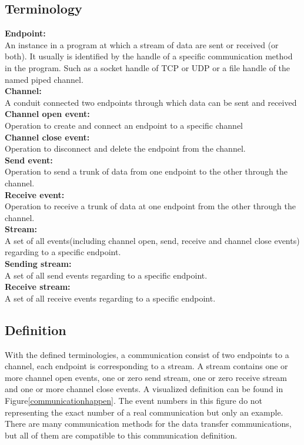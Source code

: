 \subsection{Terminology}
\textbf{Endpoint:}\\
An instance in a program at which a stream of data are sent or received (or both). It usually is identified by the handle of a specific communication method in the program. Such as a socket handle of TCP or UDP or a file handle of the named piped channel.\\
\textbf{Channel:}\\
A conduit connected two endpoints through  which data can be sent and received\\
\textbf{Channel open event:}\\
Operation to create and connect an endpoint to a specific channel\\
\textbf{Channel close event:}\\
Operation to disconnect and delete the endpoint from the channel.\\
\textbf{Send event:}\\
Operation to send a trunk of data from one endpoint to the other through  the channel.\\
\textbf{Receive event:}\\
Operation to receive a trunk of data at one endpoint from the other through the channel.\\
\textbf{Stream:}\\
A set of all events(including channel open, send, receive and channel close events) regarding to a specific endpoint.\\
\textbf{Sending stream:}\\
A set of all send events regarding to a specific endpoint.\\
\textbf{Receive stream:}\\
A set of all receive events regarding to a specific endpoint.\\


\subsection{Definition}
With the defined terminologies, a communication consist of two endpoints to a channel, each endpoint is corresponding to a stream. A stream contains one or more channel open events, one or zero send stream, one or zero receive stream and one or more channel close events. A visualized definition can be found in Figure\ref{communicationhappen}. The event numbers in this figure do not representing the exact number of a real communication but only an example. There are many communication methods for the data transfer communications, but all of them are compatible to this communication definition.

